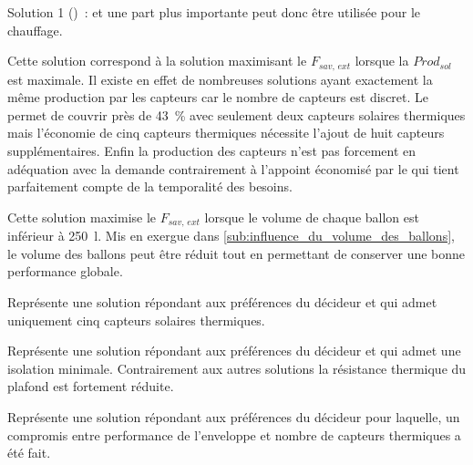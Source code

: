 \begin{blockdescription}{Solution 1 ()~:}
                                 et une part plus importante peut donc être utilisée pour le chauffage.
  \item[Solution 4 (\abr{S4})~:] Cette solution correspond à la solution maximisant le $F_{sav,\,ext}$ lorsque
                                 la $Prod_{sol}$ est maximale. Il existe en effet de nombreuses solutions ayant exactement
                                 la même production par les capteurs  car le nombre de capteurs est discret.
                                 Le  permet de couvrir près de \SI{43}{\percent} avec seulement deux capteurs
                                 solaires thermiques mais l’économie de cinq capteurs thermiques nécessite l’ajout
                                 de huit capteurs  supplémentaires. Enfin
                                 la production des capteurs n’est pas forcement en adéquation avec la demande
                                 contrairement à l’appoint économisé par le  qui tient parfaitement compte
                                 de la temporalité des besoins.
  \item[Solution 5 (\abr{S5})~:] Cette solution maximise le $F_{sav,\,ext}$ lorsque le volume de chaque
                                 ballon est inférieur à \SI{250}{\litre}. Mis en exergue dans
                                 \ref{sub:influence_du_volume_des_ballons},
                                 le volume des ballons peut être réduit tout en permettant de
                                 conserver une bonne performance globale.
  \item[Solution 6 (\abr{S6})~:] Représente une solution répondant aux préférences du décideur
                                 et qui admet uniquement cinq capteurs solaires thermiques.
  \item[Solution 7 (\abr{S7})~:] Représente une solution répondant aux préférences du décideur
                                 et qui admet une isolation minimale. Contrairement aux autres
                                 solutions la résistance thermique du plafond est fortement réduite.
  \item[Solution 8 (\abr{S8})~:] Représente une solution répondant aux préférences du décideur
                                 pour laquelle, un compromis entre performance de l’enveloppe
                                 et nombre de capteurs thermiques a été fait.
\end{blockdescription}

